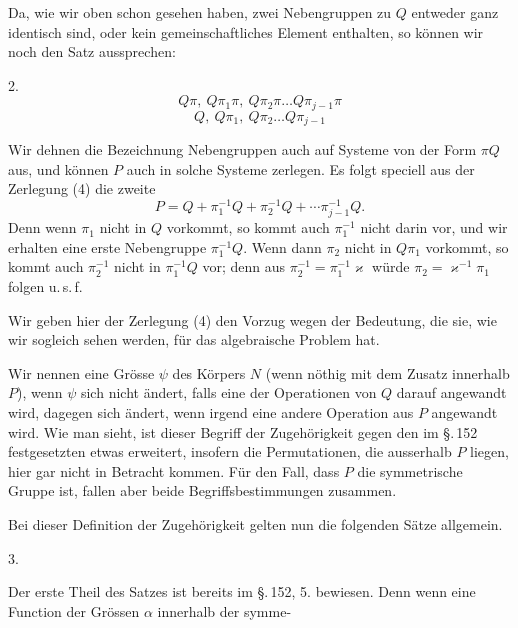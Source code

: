 
Da, wie wir oben schon gesehen haben, zwei Nebengruppen zu $Q$ entweder ganz identisch sind, oder kein gemeinschaftliches Element enthalten, so können wir noch den Satz aussprechen:

2. 
\[
Q\pi,\ Q\pi_1\pi,\ Q\pi_2\pi\ldots Q\pi_{j-1}\pi
\]
\[
Q,\ Q\pi_1,\ Q\pi_2\ldots Q\pi_{j-1}
\]

Wir dehnen die Bezeichnung Nebengruppen auch auf Systeme von der Form $\pi Q$ aus, und können $P$ auch in solche Systeme zerlegen. Es folgt speciell aus der Zerlegung (4) die zweite
\[
P = Q + \pi_1^{-1}Q + \pi_2^{-1}Q + \cdots \pi_{j-1}^{-1}Q.
\]
Denn wenn $\pi_1$ nicht in $Q$ vorkommt, so kommt auch $\pi_1^{-1}$ nicht darin vor, und wir erhalten eine erste Nebengruppe $\pi_1^{-1}Q$. Wenn dann $\pi_2$ nicht in $Q\pi_1$ vorkommt, so kommt auch $\pi_2^{-1}$ nicht in $\pi_1^{-1}Q$ vor; denn aus $\pi_2^{-1} = \pi_1^{-1}\varkappa$ würde $\pi_2 = \varkappa^{-1}\pi_1$ folgen u.\,s.\,f.

Wir geben hier der Zerlegung (4) den Vorzug wegen der Bedeutung, die sie, wie wir sogleich sehen werden, für das algebraische Problem hat.

Wir nennen eine Grösse $\psi$ des Körpers $N$  (wenn nöthig mit dem Zusatz \glqq{}innerhalb $P$\grqq{}), wenn $\psi$ sich nicht ändert, falls eine der Operationen von $Q$ darauf angewandt wird, dagegen sich ändert, wenn irgend eine andere Operation aus $P$ angewandt wird. Wie man sieht, ist dieser Begriff der Zugehörigkeit gegen den im \S.\,152 festgesetzten etwas erweitert, insofern die Permutationen, die ausserhalb $P$ liegen, hier gar nicht in Betracht kommen. Für den Fall, dass $P$ die symmetrische Gruppe ist, fallen aber beide Begriffsbestimmungen zusammen.

Bei dieser Definition der Zugehörigkeit gelten nun die folgenden Sätze allgemein.

3. 

Der erste Theil des Satzes ist bereits im \S.\,152, 5. bewiesen. Denn wenn eine Function der Grössen $\alpha$ innerhalb der symme-
